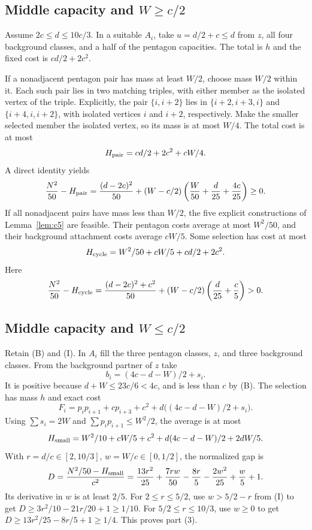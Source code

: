\documentclass[11pt]{article}
\begin{document}
\subsection{Middle capacity and $W\geq c/2$}
Assume $2c\leq d\leq10c/3$.
In a suitable $A_i$, take $u=d/2+c\leq d$ from $z$, all four
background classes, and a half of the pentagon capacities.
The total is $h$ and the fixed cost is $cd/2+2c^2$.

If a nonadjacent pentagon pair has mass at least $W/2$, choose
mass $W/2$ within it. Each such pair lies in two matching triples,
with either member as the isolated vertex of the triple.
Explicitly, the pair $\{i,i+2\}$ lies in
$\{i+2,i+3,i\}$ and $\{i+4,i,i+2\}$, with isolated vertices
$i$ and $i+2$, respectively.
Make the smaller selected member the isolated vertex, so its mass
is at most $W/4$. The total cost is at most
\[
 H_{\rm pair}=cd/2+2c^2+cW/4 .
\]
A direct identity yields
\[
 \frac{N^2}{50}-H_{\rm pair}
 =\frac{(d-2c)^2}{50}
 +(W-c/2)\left(\frac W{50}+\frac d{25}+\frac{4c}{25}\right)\geq0 .
\]
If all nonadjacent pairs have mass less than $W/2$, the five explicit
constructions of Lemma~\ref{lem:c5} are feasible.
Their pentagon costs average at most $W^2/50$, and their background
attachment costs average $cW/5$. Some selection has cost at most
\[
 H_{\rm cycle}=W^2/50+cW/5+cd/2+2c^2.
\]
Here
\[
 \frac{N^2}{50}-H_{\rm cycle}
 =\frac{(d-2c)^2+c^2}{50}
 +(W-c/2)\left(\frac d{25}+\frac c5\right)>0 .
\]

\subsection{Middle capacity and $W\leq c/2$}
Retain (B) and (I).
In $A_i$ fill the three pentagon classes, $z$, and three background
classes. From the background partner of $z$ take
\[
 b_i=(4c-d-W)/2+s_i .
\]
It is positive because $d+W\leq23c/6<4c$, and is less than $c$ by (B).
The selection has mass $h$ and exact cost
\[
 F_i=p_ip_{i+1}+cp_{i+3}+c^2+
             d\big((4c-d-W)/2+s_i\big).
\]
Using $\sum s_i=2W$ and $\sum p_ip_{i+1}\leq W^2/2$, the average is
at most
\[
 H_{\rm small}=W^2/10+cW/5+c^2+d(4c-d-W)/2+2dW/5.
\]
With $r=d/c\in[2,10/3]$, $w=W/c\in[0,1/2]$, the normalized gap is
\[
 D=\frac{N^2/50-H_{\rm small}}{c^2}
  =\frac{13r^2}{25}+\frac{7rw}{50}-\frac{8r}{5}
   -\frac{2w^2}{25}+\frac w5+1.
\]
Its derivative in $w$ is at least $2/5$.
For $2\leq r\leq5/2$, use $w>5/2-r$ from (I) to get
$D\geq3r^2/10-21r/20+1\geq1/10$.
For $5/2\leq r\leq10/3$, use $w\geq0$ to get
$D\geq13r^2/25-8r/5+1\geq1/4$.
This proves part (3).
\end{document}
